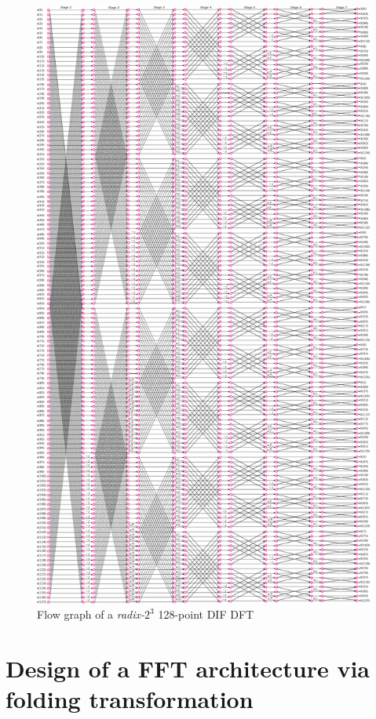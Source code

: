 \documentclass[journal,comsoc]{IEEEtran}
\begin{document}
\begin{figure} 
	\centering
	\includegraphics[width=\linewidth]{Diagramas/miSeccionFiguras/128PuntosRadix8Conexion.pdf}
	\caption{Flow graph of a \textit{radix-}$2^3$ 128-point DIF DFT}
	\label{fig:128ponits_conn}
\end{figure}



\section{Design of a FFT architecture via folding transformation} \label{sec:16points}
\end{document}
